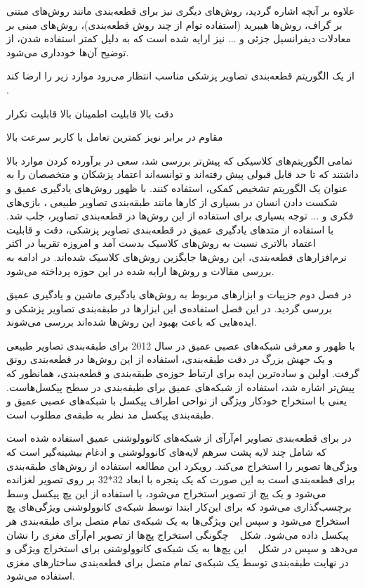 علاوه بر آنچه اشاره گردید، روش‌های دیگری نیز برای قطعه‌بندی مانند روش‌های مبتنی بر گراف، روش‌ها هیبرید (استفاده توام از چند روش قطعه‌بندی)، روش‌های مبنی بر معادلات دیفرانسیل جزئی و ... نیز ارایه شده است  که به دلیل کمتر استفاده شدن، از توضیح آن‌ها خودداری می‌شود.

از یک الگوریتم قطعه‌بندی تصاویر پزشکی مناسب انتظار می‌رود موارد زیر را ارضا کند .
\begin{multicols}{2}
	 دقت بالا
	 قابلیت اطمینان بالا
	 قابلیت تکرار
	
	 مقاوم در برابر نویز
	 کمترین تعامل با کاربر
	 سرعت بالا
	
\end{multicols}
تمامی الگوریتم‌های کلاسیکی که پیش‌تر بررسی شد، سعی در برآورده کردن موارد بالا داشتند که تا حد قابل قبولی پیش رفته‌اند و توانسه‌اند اعتماد پزشکان و متخصصان را به عنوان یک الگوریتم تشخیص کمکی، استفاده کنند. با ظهور روش‌های یادگیری عمیق و شکست دادن انسان  در بسیاری از کارها مانند طبقه‌بندی تصاویر طبیعی ، بازی‌های فکری و ... توجه بسیاری برای استفاده از این روش‌ها در قطعه‌بندی تصاویر، جلب شد. با استفاده‌ از متدهای یادگیری عمیق در قطعه‌بندی تصاویر پزشکی، دقت و قابلیت اعتماد بالاتری نسبت به روش‌های کلاسیک بدست آمد و امروزه تقریبا در اکثر نرم‌افزارهای قطعه‌بندی، این روش‌ها جایگزین روش‌های کلاسیک شده‌اند. در ادامه به بررسی مقالات و روش‌ها ارایه شده در این حوزه پرداخته می‌شود.

در فصل دوم جزییات و ابزارهای مربوط به روش‌های یادگیری ماشین و یادگیری عمیق بررسی گردید. در این فصل استفاده‌ی این ابزارها در طبقه‌بندی تصاویر پزشکی و ایده‌هایی که باعث بهبود این روش‌ها شده‌اند بررسی می‌شوند.

با ظهور و معرفی شبکه‌های عصبی عمیق در سال 2012 برای طبقه‌بندی تصاویر طبیعی  و یک جهش بزرگ در دقت طبقه‌بندی، استفاده از این روش‌ها در قطعه‌بندی رونق گرفت. اولین و ساده‌ترین ایده‌ برای ارتباط حوزه‌ی طبقه‌بندی و قطعه‌بندی، همانطور که پیش‌تر اشاره شد، استفاده از شبکه‌های عمیق برای طبقه‌بندی در سطح پیکسل‌هاست. یعنی با استخراج خودکار ویژگی از نواحی اطراف پیکسل با شبکه‌های عصبی عمیق و طبقه‌بندی پیکسل مد نظر به طبقه‌ی مطلوب است.

در  برای قطعه‌بندی تصاویر ام‌آرآی از شبکه‌های کانوولوشنی عمیق استفاده شده است که شامل چند لایه‌ پشت سرهم لایه‌های کانوولوشنی و ادغام بیشینه‌گیر است که ویژگی‌ها تصویر را استخراج می‌‌کند. رویکرد این مطالعه استفاده از روش‌های طبقه‌بندی برای قطعه‌بندی است به این صورت که یک پنجره با ابعاد 32*32 بر روی تصویر لغزانده می‌شود و یک پچ از تصویر استخراج می‌شود، با استفاده از این پچ پیکسل وسط برچسب‌گذاری می‌شود که برای این‌کار ابتدا توسط شبکه‌ی کانوولوشنی ویژگی‌های پچ استخراج می‌شود و سپس این ویژگی‌ها به یک شبکه‌ی تمام متصل برای طبقه‌بندی هر پیکسل داده می‌شود. شکل ~ چگونگی استخراج پچ‌ها از تصویر ام‌آرآی مغزی را نشان می‌دهد و سپس در شکل ~ این پچ‌ها به یک شبکه‌ی کانوولوشنی برای استخراج ویژگی و در نهایت طبقه‌بندی توسط یک شبکه‌ی تمام متصل برای قطعه‌بندی ساختارهای مغزی استفاده می‌شود.


